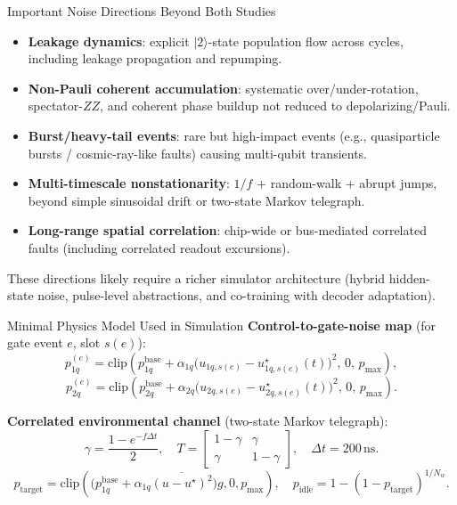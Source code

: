 \documentclass[10pt,aspectratio=169]{beamer}
\begin{document}
\begin{frame}{Important Noise Directions Beyond Both Studies}
  \small
  \begin{itemize}
    \item \textbf{Leakage dynamics}: explicit \(|2\rangle\)-state population flow across cycles, including leakage propagation and repumping.
    \item \textbf{Non-Pauli coherent accumulation}: systematic over/under-rotation, spectator-\(ZZ\), and coherent phase buildup not reduced to depolarizing/Pauli.
    \item \textbf{Burst/heavy-tail events}: rare but high-impact events (e.g., quasiparticle bursts / cosmic-ray-like faults) causing multi-qubit transients.
    \item \textbf{Multi-timescale nonstationarity}: \(1/f\) + random-walk + abrupt jumps, beyond simple sinusoidal drift or two-state Markov telegraph.
    \item \textbf{Long-range spatial correlation}: chip-wide or bus-mediated correlated faults (including correlated readout excursions).
  \end{itemize}
  \vspace{0.25em}
  \small
  These directions likely require a richer simulator architecture (hybrid hidden-state noise, pulse-level abstractions, and co-training with decoder adaptation).
\end{frame}

\begin{frame}{Minimal Physics Model Used in Simulation}
  \small
  \textbf{Control-to-gate-noise map} (for gate event \(e\), slot \(s(e)\)):
  \[
    p_{1q}^{(e)}=\mathrm{clip}\!\left(p_{1q}^{\mathrm{base}}+\alpha_{1q}\big(u_{1q,s(e)}-u_{1q,s(e)}^\star(t)\big)^2,\,0,\,p_{\max}\right),
  \]
  \[
    p_{2q}^{(e)}=\mathrm{clip}\!\left(p_{2q}^{\mathrm{base}}+\alpha_{2q}\big(u_{2q,s(e)}-u_{2q,s(e)}^\star(t)\big)^2,\,0,\,p_{\max}\right).
  \]

  \vspace{0.25em}
  \textbf{Correlated environmental channel} (two-state Markov telegraph):
  \[
    \gamma=\frac{1-e^{-f\Delta t}}{2},\quad
    T=
    \begin{bmatrix}
      1-\gamma & \gamma\\
      \gamma & 1-\gamma
    \end{bmatrix},
    \quad \Delta t=200\,\mathrm{ns}.
  \]
  \[
    p_{\mathrm{target}}=\mathrm{clip}\!\left(\big(p_{1q}^{\mathrm{base}}+\alpha_{1q}\overline{(u-u^\star)^2}\big)g,0,p_{\max}\right),
    \quad
    p_{\mathrm{idle}}=1-(1-p_{\mathrm{target}})^{1/N_w}.
  \]
\end{frame}
\end{document}
